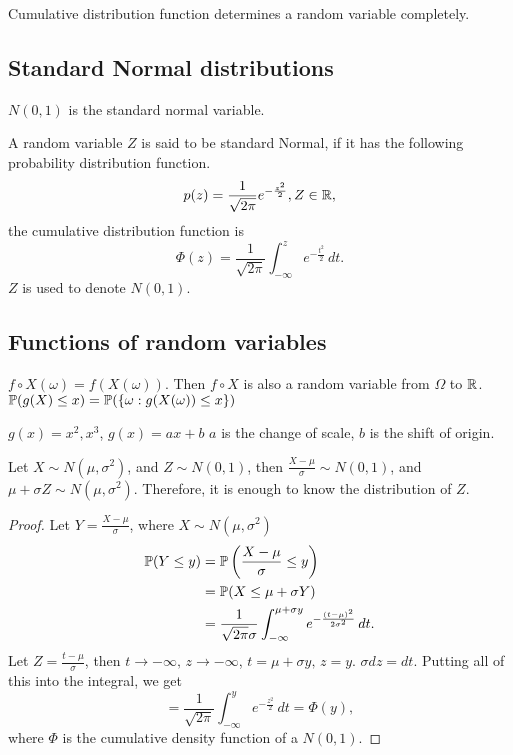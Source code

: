 \documentclass[10pt, a4paper]{article}
\begin{document}
\begin{theorem}
    Cumulative distribution function determines a random variable completely.
\end{theorem}

\subsection{Standard Normal distributions}
$N(0, 1)$ is the standard normal variable.
\begin{definition}
    A random variable $Z$ is said to be standard Normal,
    if it has the following probability distribution function.
    \[
    p(z) = \frac{1}{\sqrt{2\pi}}e ^ {-\frac{z ^ 2}{2}}, Z \in \R,
    \]
    the cumulative distribution function is
    \[
    \Phi(z) = \frac{1}{\sqrt{2\pi}}\int_{-\infty}^ze ^ {-\frac{t ^ 2}{2}}\,dt.
    \]
    $Z$ is used to denote $N(0, 1)$.
\end{definition}

\subsection{Functions of random variables}
$f \circ X(\omega) = f(X(\omega))$.
Then $f \circ X$ is also a random variable from $\Omega$ to $\R$.
$\P(g(X) \leq x) = \P(\{\omega : g(X(\omega)) \leq x\})$
\begin{example}
    $g(x) = x ^ 2, x ^ 3$,
    $g(x) = ax + b$
    $a$ is the change of scale,
    $b$ is the shift of origin.
\end{example}

\begin{theorem}
    Let $X \sim N(\mu, \sigma ^ 2)$,
    and $Z \sim N(0, 1)$,
    then
    $\frac{X - \mu}{\sigma} \sim N(0, 1)$,
    and $\mu + \sigma Z \sim N(\mu, \sigma ^ 2)$.
    Therefore,
    it is enough to know the distribution of $Z$.
    \begin{proof}
        Let $Y = \frac{X - \mu}{\sigma}$,
        where $X \sim N(\mu, \sigma ^ 2)$
        \begin{align*}
            \P(Y \leq y) &= \P\left(\frac{X - \mu}{\sigma} \leq y\right) \\
            &= \P(X \leq \mu + \sigma Y) \\
            &= \frac{1}{\sqrt{2\pi}\sigma}\int_{-\infty}^{\mu + \sigma y}e ^ {-\frac{(t - \mu) ^ 2}{2\sigma ^ 2}}\,dt.
        \end{align*}
        Let $Z = \frac{t - \mu}{\sigma}$,
        then $t \rightarrow -\infty,\, z \rightarrow -\infty$,
        $t = \mu + \sigma y,\, z = y$.
        $\sigma dz = dt$.
        Putting all of this into the integral,
        we get
        \[
        = \frac{1}{\sqrt{2\pi}}\int_{-\infty}^{y}e ^ {-\frac{z ^ 2}{2}}\,dt = \Phi(y),
        \]
        where $\Phi$ is the cumulative density function of a $N(0, 1)$.
    \end{proof}
\end{theorem}
\end{document}
